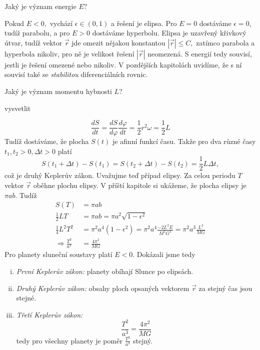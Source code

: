 Jaký je význam energie $E?$

Pokud $E<0,$ vychází $\epsilon\in(0,1)$ a řešení je elipsa. Pro $E=0$ dostáváme $\epsilon=0$, tudíž parabolu, a pro $E>0$ dostáváme hyperbolu. Elipsa je uzavřený křivkový útvar, tudíž vektor $\vec{r}$ jde omezit nějakou konstantou $|\vec{r}|\leq C,$ zatímco parabola a hyperbola nikoliv, pro ně je velikost řešení $|\vec{r}|$ neomezená. S energií tedy souvisí, jestli je řešení omezené nebo nikoliv. V pozdějších kapitolách uvidíme, že s ní souvisí také se \emph{stabilitou} diferenciálních rovnic.

Jaký je význam momentu hybnosti $L?$ 
\begin{Todo}
  vysvetlit
\end{Todo}
\begin{equation*}
  \frac{dS}{dt}=\frac{dS}{d\varphi}\frac{d\varphi}{dt}=\frac{1}{2}r^{2}\omega = \frac{1}{2}L
\end{equation*}
Tudíž dostáváme, že plocha $S(t)$ je afinní funkcí času. Takže pro dva různé časy $t_1,t_2>0, \Delta t>0$ platí
\begin{equation*}
  S(t_1+\Delta t)-S(t_1)=S(t_2+\Delta t)-S(t_2)=\frac{1}{2}L\Delta t,
\end{equation*}
což je druhý Keplerův zákon. Uvažujme teď případ elipsy. Za celou periodu $T$ vektor $\vec{r}$ oběhne plochu elipsy. V příští kapitole si ukážeme, že plocha elipsy je $\pi a b.$ Tudíž
\begin{align*}
	S(T) &= \pi ab \\
	\frac{1}{2}LT &= \pi ab = \pi a^2 \sqrt{1-\epsilon^{2}} \\
	\frac{1}{4}L^2T^2 &= \pi^2 a^4 (1-\epsilon^{2})=\pi^2 a^4 \frac{-2L^{2}E}{M^{2}G^{2}} = \pi^2 a^3 \frac{L^{2}}{MG} \\
	\Rightarrow \frac{T^2}{a^3}&= \frac{4\pi^{2}}{MG}
\end{align*}
Pro planety sluneční soustavy platí $E<0$. Dokázali jsme tedy

\begin{věta}\leavevmode
  \begin{enumerate}[(i)]
	  \item \textit{První Keplerův zákon:} planety obíhají Slunce po elipsách.
	\item \textit{Druhý Keplerův zákon:} obsahy ploch opsaných vektorem $\vec{r}$ za stejný čas jsou stejné.
	\item \textit{Třetí Keplerův zákon:}
		\begin{equation*}
		  \frac{T^{2}}{a^{3}}=\frac{4\pi^{2}}{MG}
		\end{equation*}
		tedy pro všechny planety je poměr $\frac{T^{2}}{a^{3}}$ stejný.
  \end{enumerate}
\end{věta}
